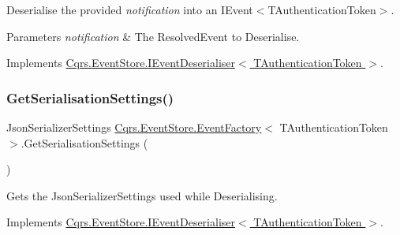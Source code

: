 Deserialise the provided {\itshape notification}  into an I\+Event$<$\+T\+Authentication\+Token$>$. 


\begin{DoxyParams}{Parameters}
{\em notification} & The Resolved\+Event to Deserialise.\\
\hline
\end{DoxyParams}


Implements \hyperlink{interfaceCqrs_1_1EventStore_1_1IEventDeserialiser_a931d4a498b2213aac492bd35518a3286_a931d4a498b2213aac492bd35518a3286}{Cqrs.\+Event\+Store.\+I\+Event\+Deserialiser$<$ T\+Authentication\+Token $>$}.

\mbox{\label{classCqrs_1_1EventStore_1_1EventFactory_a4e52c4fd639d1af97b1ecc5052189783_a4e52c4fd639d1af97b1ecc5052189783}} 
\subsubsection{\texorpdfstring{Get\+Serialisation\+Settings()}{GetSerialisationSettings()}}
{\footnotesize\ttfamily Json\+Serializer\+Settings \hyperlink{classCqrs_1_1EventStore_1_1EventFactory}{Cqrs.\+Event\+Store.\+Event\+Factory}$<$ T\+Authentication\+Token $>$.Get\+Serialisation\+Settings (\begin{DoxyParamCaption}{ }\end{DoxyParamCaption})}



Gets the Json\+Serializer\+Settings used while Deserialising. 



Implements \hyperlink{interfaceCqrs_1_1EventStore_1_1IEventDeserialiser_aa2859d10fd556b743679079ac15ffdde_aa2859d10fd556b743679079ac15ffdde}{Cqrs.\+Event\+Store.\+I\+Event\+Deserialiser$<$ T\+Authentication\+Token $>$}.

